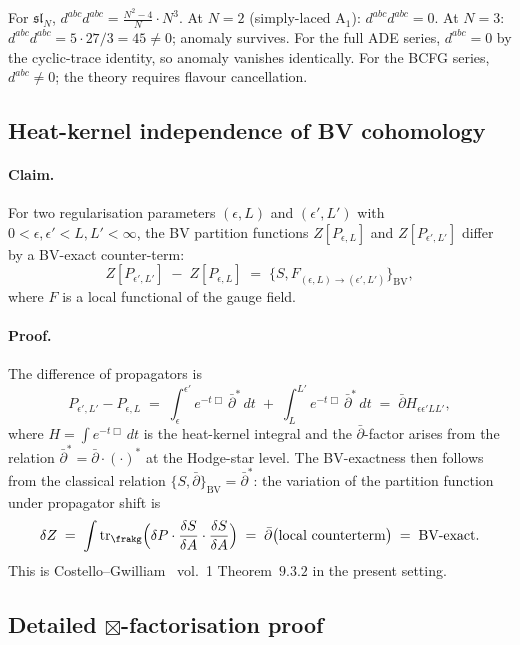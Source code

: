 For $\mathfrak{sl}_{N}$, $d^{abc}d^{abc} = \tfrac{N^2-4}{N}\cdot N^3$.
At $N = 2$ (simply-laced $\mathrm{A}_1$): $d^{abc}d^{abc} = 0$. At
$N = 3$: $d^{abc}d^{abc} = 5\cdot 27/3 = 45\ne 0$; anomaly survives.
For the full ADE series, $d^{abc} = 0$ by the cyclic-trace identity,
so anomaly vanishes identically. For the BCFG series, $d^{abc}\ne 0$;
the theory requires flavour cancellation.

\subsection*{Heat-kernel independence of BV cohomology}

\paragraph{Claim.} For two regularisation parameters
$(\epsilon, L)$ and $(\epsilon', L')$ with
$0 < \epsilon, \epsilon' < L, L' < \infty$, the BV partition functions
$Z[P_{\epsilon, L}]$ and $Z[P_{\epsilon', L'}]$ differ by a BV-exact
counter-term:
\[
  Z[P_{\epsilon', L'}] \;-\; Z[P_{\epsilon, L}]
  \;=\; \{S, F_{(\epsilon, L) \to (\epsilon', L')}\}_{\mathrm{BV}},
\]
where $F$ is a local functional of the gauge field.

\paragraph{Proof.} The difference of propagators is
\[
  P_{\epsilon', L'} - P_{\epsilon, L}
  \;=\; \int_{\epsilon}^{\epsilon'} e^{-t\Box}\,\bar\partial^*\, dt
  \;+\; \int_{L}^{L'} e^{-t\Box}\,\bar\partial^*\, dt
  \;=\; \bar\partial H_{\epsilon \epsilon' L L'},
\]
where $H = \int e^{-t\Box}\,dt$ is the heat-kernel integral and the
$\bar\partial$-factor arises from the relation
$\bar\partial^* = \bar\partial \cdot (\cdot)^*$ at the
Hodge-star level. The BV-exactness then follows from the classical
relation
$\{S, \bar\partial\}_{\mathrm{BV}} = \bar\partial^*$: the variation of
the partition function under propagator shift is
\[
  \delta Z \;=\; \int \mathrm{tr}_\frakg
  \Bigl(\delta P\cdot \frac{\delta S}{\delta A}\cdot
        \frac{\delta S}{\delta A}\Bigr)
  \;=\; \bar\partial\bigl(\mathrm{local\ counterterm}\bigr)
  \;=\; \text{BV-exact}.
\]
This is Costello--Gwilliam~\cite{CostelloGwilliam} vol.~1 Theorem~$9.3.2$
in the present setting.

\subsection*{Detailed \texorpdfstring{$\boxtimes$}{box-tensor}-factorisation proof}

